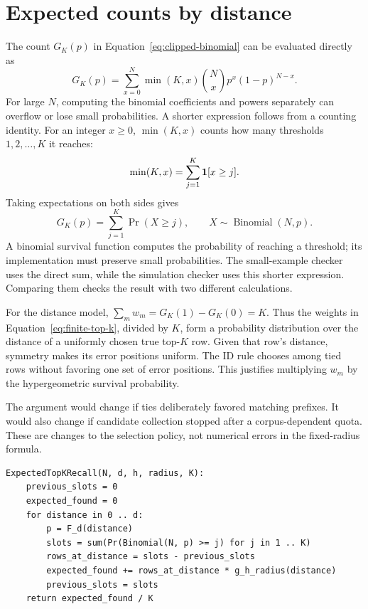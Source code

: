 \section{Expected counts by distance}
\label{sec:finite-distance-details}
The count $G_K(p)$ in Equation~\eqref{eq:clipped-binomial} can be evaluated directly as
\[
G_K(p)=\sum_{x=0}^{N}\min(K,x)\binom Nx p^x(1-p)^{N-x}.
\]
For large $N$, computing the binomial coefficients and powers separately can overflow or lose
small probabilities. A shorter expression follows from a counting identity. For an integer
$x\ge0$, $\min(K,x)$ counts how many thresholds $1,2,\ldots,K$ it reaches:
\[
\min(K,x)=\sum_{j=1}^{K}\mathbf 1[x\ge j].
\]
Taking expectations on both sides gives
\begin{equation}
G_K(p)=\sum_{j=1}^{K}\Pr(X\ge j),\qquad X\sim\operatorname{Binomial}(N,p).
\label{eq:clipped-survival}
\end{equation}
A binomial survival function computes the probability of reaching a threshold; its
implementation must preserve small probabilities. The small-example checker uses the
direct sum, while the simulation checker uses this shorter expression. Comparing them
checks the result with two different calculations.

For the distance model, $\sum_m w_m=G_K(1)-G_K(0)=K$. Thus the weights in
Equation~\eqref{eq:finite-top-k}, divided by $K$, form a probability distribution over the
distance of a uniformly chosen true top-$K$ row. Given that row's distance, symmetry makes
its error positions uniform. The ID rule chooses among tied rows without favoring one set of
error positions. This justifies multiplying $w_m$ by the hypergeometric survival probability.

The argument would change if ties deliberately favored matching prefixes. It would also change
if candidate collection stopped after a corpus-dependent quota. These are changes to the
selection policy, not numerical errors in the fixed-radius formula.

\par\noindent\begin{minipage}{\linewidth}
\begin{lstlisting}[caption={Expected top-K recall for a fixed prefix radius.}]
ExpectedTopKRecall(N, d, h, radius, K):
    previous_slots = 0
    expected_found = 0
    for distance in 0 .. d:
        p = F_d(distance)
        slots = sum(Pr(Binomial(N, p) >= j) for j in 1 .. K)
        rows_at_distance = slots - previous_slots
        expected_found += rows_at_distance * g_h_radius(distance)
        previous_slots = slots
    return expected_found / K
\end{lstlisting}
\end{minipage}\par

